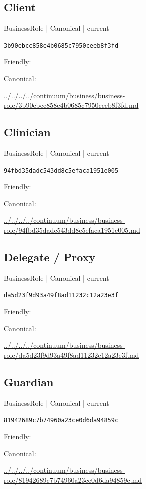 \documentclass[10pt,a4paper]{article}
\begin{document}
\subsection*{Client}
{\small BusinessRole | Canonical | current}\par
\texttt{3b90ebcc858e4b0685c7950ceeb8f3fd}\par
Friendly: \par
Canonical: \par
{\footnotesize\url{../../../../continuum/business/business-role/3b90ebcc858e4b0685c7950ceeb8f3fd.md}}\par
\subsection*{Clinician}
{\small BusinessRole | Canonical | current}\par
\texttt{94fbd35dadc543dd8c5efaca1951e005}\par
Friendly: \par
Canonical: \par
{\footnotesize\url{../../../../continuum/business/business-role/94fbd35dadc543dd8c5efaca1951e005.md}}\par
\subsection*{Delegate / Proxy}
{\small BusinessRole | Canonical | current}\par
\texttt{da5d23f9d93a49f8ad11232c12a23e3f}\par
Friendly: \par
Canonical: \par
{\footnotesize\url{../../../../continuum/business/business-role/da5d23f9d93a49f8ad11232c12a23e3f.md}}\par
\subsection*{Guardian}
{\small BusinessRole | Canonical | current}\par
\texttt{81942689c7b74960a23ce0d6da94859c}\par
Friendly: \par
Canonical: \par
{\footnotesize\url{../../../../continuum/business/business-role/81942689c7b74960a23ce0d6da94859c.md}}\par
\end{document}
